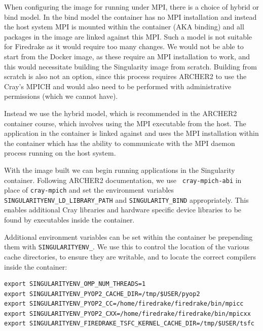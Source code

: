 \documentclass[a4paper,11pt]{article}
\begin{document}
When configuring the image for running under MPI, there is a choice of hybrid or bind model.
In the bind model the container has no MPI installation and instead the host system MPI is mounted within the container (AKA binding) and all packages in the image are linked against this MPI.
Such a model is not suitable for Firedrake as it would require too many changes.
We would not be able to start from the Docker image, as these require an MPI installation to work, and this would necessitate building the Singularity image from scratch.
Building from scratch is also not an option, since this process requires ARCHER2 to use the Cray's MPICH and would also need to be performed with administrative permissions (which we cannot have).

Instead we use the hybrid model, which is recommended in the ARCHER2 container course, which involves using the MPI executable from the host.
The application in the container is linked against and uses the MPI installation within the container which has the ability to communicate with the MPI daemon process running on the host system.

With the image built we can begin running applications in the Singularity container.
Following ARCHER2 documentation\cite{archer2docs,archer2course}, we use \verb` cray-mpich-abi` in place of \verb`cray-mpich` and set the environment variables \verb`SINGULARITYENV_LD_LIBRARY_PATH` and \verb`SINGULARITY_BIND` appropriately.
This enables additional Cray libraries and hardware specific device libraries to be found by executables inside the container.

Additional environment variables can be set within the container be prepending them with \verb`SINGULARITYENV_`.
We use this to control the location of the various cache directories, to ensure they are writable, and to locate the correct compilers inside the container:
\begin{lstlisting}
export SINGULARITYENV_OMP_NUM_THREADS=1
export SINGULARITYENV_PYOP2_CACHE_DIR=/tmp/$USER/pyop2
export SINGULARITYENV_PYOP2_CC=/home/firedrake/firedrake/bin/mpicc
export SINGULARITYENV_PYOP2_CXX=/home/firedrake/firedrake/bin/mpicxx
export SINGULARITYENV_FIREDRAKE_TSFC_KERNEL_CACHE_DIR=/tmp/$USER/tsfc
\end{lstlisting}
\end{document}

